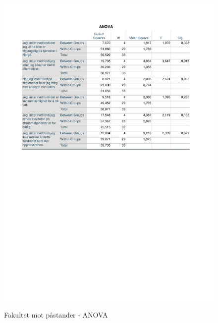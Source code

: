 \begin{figure}[H]
    \centering
    \includegraphics[scale=0.7]{case_1/bilder/ANOVA_fakultet-pastand.pdf}
    \label{fig:ANOVA_fakultet-påstand}
    \caption{Fakultet mot påstander - ANOVA}
\end{figure}



